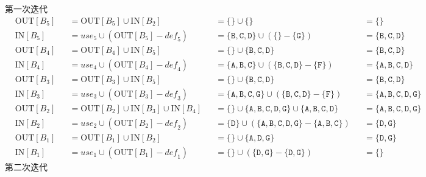 \documentclass{article}
\begin{document}
第一次迭代
\begin{align*}
    & \text{OUT}[B_5] &&= \text{OUT}[B_5] \cup \text{IN}[B_2]    &&= \{  \} \cup \{  \} &&= \{  \} \\
    & \text{IN}[B_5]  &&= \textit{use}_5 \cup ( \text{OUT}[B_5] - \textit{def}_5 ) &&= \{\texttt{B},\texttt{C},\texttt{D}\} \cup ( \{  \} - \{\texttt{G}\} ) &&= \{\texttt{B},\texttt{C},\texttt{D}\} \\
    & \text{OUT}[B_4] &&= \text{OUT}[B_4] \cup \text{IN}[B_5]    &&= \{  \} \cup \{\texttt{B},\texttt{C},\texttt{D}\} &&= \{\texttt{B},\texttt{C},\texttt{D}\} \\
    & \text{IN}[B_4]  &&= \textit{use}_4 \cup ( \text{OUT}[B_4] - \textit{def}_4 ) &&= \{\texttt{A},\texttt{B},\texttt{C}\} \cup ( \{\texttt{B},\texttt{C},\texttt{D}\} - \{\texttt{F}\} ) &&= \{\texttt{A},\texttt{B},\texttt{C},\texttt{D}\} \\
    & \text{OUT}[B_3] &&= \text{OUT}[B_3] \cup \text{IN}[B_5]    &&= \{  \} \cup \{\texttt{B},\texttt{C},\texttt{D}\} &&= \{\texttt{B},\texttt{C},\texttt{D}\} \\
    & \text{IN}[B_3]  &&= \textit{use}_3 \cup ( \text{OUT}[B_3] - \textit{def}_3 ) &&= \{\texttt{A},\texttt{B},\texttt{C},\texttt{G}\} \cup ( \{\texttt{B},\texttt{C},\texttt{D}\} - \{\texttt{F}\} ) &&= \{\texttt{A},\texttt{B},\texttt{C},\texttt{D},\texttt{G}\} \\
    & \text{OUT}[B_2] &&= \text{OUT}[B_2] \cup \text{IN}[B_3] \cup \text{IN}[B_4]    &&= \{  \} \cup \{\texttt{A},\texttt{B},\texttt{C},\texttt{D},\texttt{G}\} \cup \{\texttt{A},\texttt{B},\texttt{C},\texttt{D}\} &&= \{\texttt{A},\texttt{B},\texttt{C},\texttt{D},\texttt{G}\} \\
    & \text{IN}[B_2]  &&= \textit{use}_2 \cup ( \text{OUT}[B_2] - \textit{def}_2 ) &&= \{\texttt{D}\} \cup ( \{\texttt{A},\texttt{B},\texttt{C},\texttt{D},\texttt{G}\} - \{\texttt{A},\texttt{B},\texttt{C}\} ) &&= \{\texttt{D},\texttt{G}\} \\
    & \text{OUT}[B_1] &&= \text{OUT}[B_1] \cup \text{IN}[B_2]    &&= \{  \} \cup \{\texttt{A},\texttt{D},\texttt{G}\} &&= \{\texttt{D},\texttt{G}\} \\
    & \text{IN}[B_1]  &&= \textit{use}_1 \cup ( \text{OUT}[B_1] - \textit{def}_1 ) &&= \{  \} \cup ( \{\texttt{D},\texttt{G}\} - \{\texttt{D},\texttt{G}\} ) &&= \{  \}
\end{align*}
第二次迭代
\end{document}
